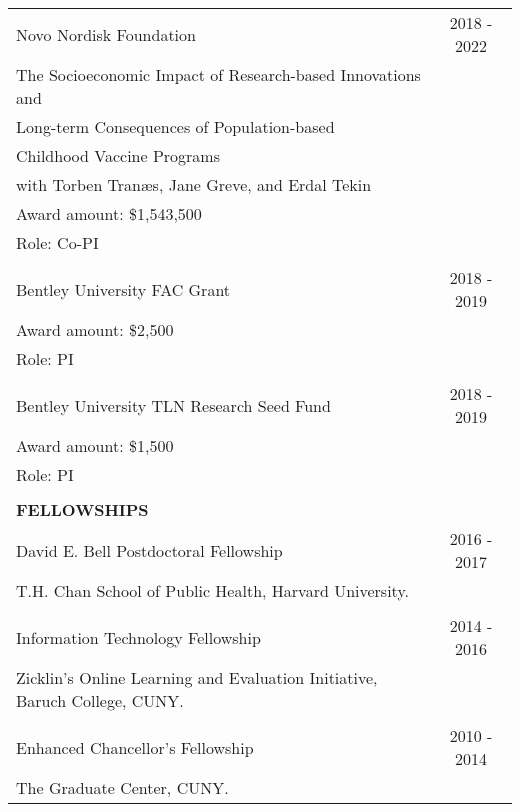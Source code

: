 \documentclass[12 pt]{article}
\begin{document}
\begin{longtable}{ccccc}
 \multicolumn{4}{l}{Novo Nordisk Foundation} & \multicolumn{1}{c}{2018 - 2022} \\
\multicolumn{4}{l}{The Socioeconomic Impact of Research-based Innovations and }  \\
  \multicolumn{4}{l}{Long-term Consequences of Population-based} \\
  \multicolumn{4}{l}{Childhood Vaccine Programs }  \\
  \multicolumn{4}{l}{with Torben Tran{\ae}s, Jane Greve, and Erdal Tekin}  \\
  \multicolumn{4}{l}{Award amount: \$1,543,500 }  \\
    \multicolumn{4}{l}{Role: Co-PI}  \\
  \\

 \multicolumn{4}{l}{Bentley University FAC Grant} & \multicolumn{1}{c}{2018 - 2019} \\
\multicolumn{4}{l}{Award amount: \$2,500}  \\
    \multicolumn{4}{l}{Role: PI}  \\
\\

 \multicolumn{4}{l}{Bentley University TLN Research Seed Fund} & \multicolumn{1}{c}{2018 - 2019} \\
\multicolumn{4}{l}{Award amount: \$1,500}  \\
    \multicolumn{4}{l}{Role: PI}  \\
\\



 \multicolumn{5}{l}{\textbf{FELLOWSHIPS}}\\[2 pt] 

 \multicolumn{4}{l}{David E. Bell Postdoctoral Fellowship} & \multicolumn{1}{c}{2016 - 2017} \\
\multicolumn{4}{l}{T.H. Chan School of Public Health, Harvard University.}   \\
\\
 \multicolumn{4}{l}{Information Technology Fellowship} & \multicolumn{1}{c}{2014 - 2016} \\
\multicolumn{4}{l}{Zicklin's Online Learning and Evaluation Initiative, Baruch College, CUNY.}   \\
\\
 \multicolumn{4}{l}{Enhanced Chancellor's Fellowship} & \multicolumn{1}{c}{2010 - 2014} \\
\multicolumn{4}{l}{The Graduate Center, CUNY.}   \\


\end{longtable}
\end{document}
